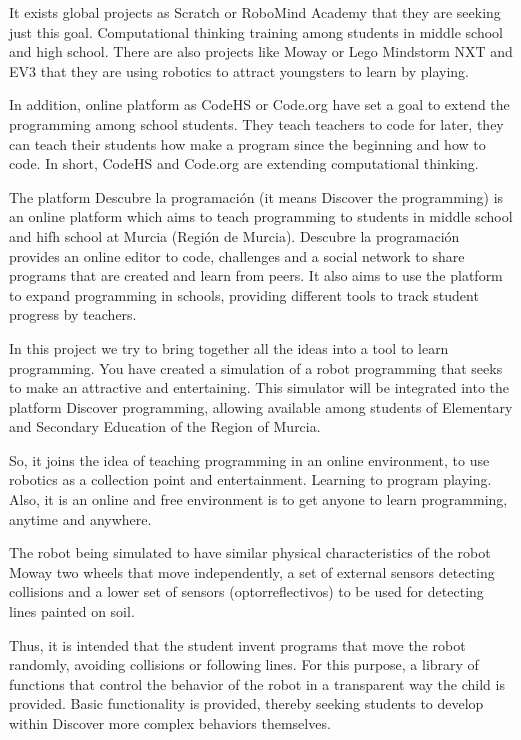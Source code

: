 It exists global projects as Scratch or RoboMind Academy that they are seeking just this goal. Computational thinking training among students in middle school and high school. There are also projects like Moway or Lego Mindstorm NXT and EV3 that they are using robotics to attract youngsters to learn by playing. 

In addition, online platform as CodeHS or Code.org have set a goal to extend the programming among school students. They teach teachers to code for later, they can teach their students how make a program since the beginning and how to code. In short, CodeHS and Code.org are extending computational thinking.

The platform Descubre la programación (it means Discover the programming) is an online platform which aims to teach programming to students in middle school and hifh school at Murcia (Región de Murcia). Descubre la programación provides an online editor to code, challenges and a social network to share programs that are created and learn from peers. It also aims to use the platform to expand programming in schools, providing different tools to track student progress by teachers.



In this project we try to bring together all the ideas into a tool to learn programming. You have created a simulation of a robot programming that seeks to make an attractive and entertaining. This simulator will be integrated into the platform Discover programming, allowing available among students of Elementary and Secondary Education of the Region of Murcia.

So, it joins the idea of teaching programming in an online environment, to use robotics as a collection point and entertainment. Learning to program playing. Also, it is an online and free environment is to get anyone to learn programming, anytime and anywhere.

The robot being simulated to have similar physical characteristics of the robot Moway two wheels that move independently, a set of external sensors detecting collisions and a lower set of sensors (optorreflectivos) to be used for detecting lines painted on soil.

Thus, it is intended that the student invent programs that move the robot randomly, avoiding collisions or following lines. For this purpose, a library of functions that control the behavior of the robot in a transparent way the child is provided. Basic functionality is provided, thereby seeking students to develop within Discover more complex behaviors themselves.

